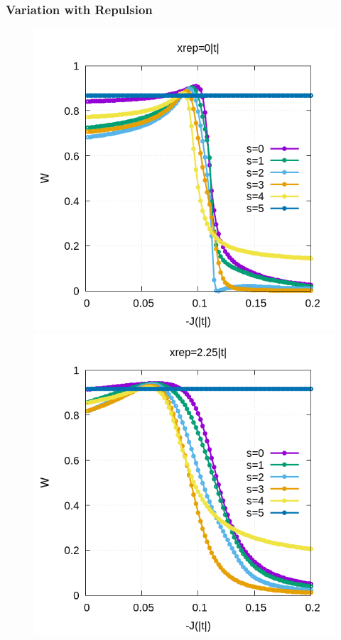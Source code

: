 \documentclass[ openright,titlepage,numbers=noenddot,headinclude,twoside,%
                footinclude=true,cleardoublepage=empty,abstractoff,%
                BCOR=5mm,paper=a4,fontsize=11pt,%
                ngerman,american,%
]{scrreprt}
\begin{document}
\subsubsection{Variation with Repulsion}
\begin{figure}[h!]
\centering
    \hspace{-2cm}
    \begin{minipage}{0.4\textwidth}
    \includegraphics[scale=0.4]{W_vs_J_sites_2-xrep-01.png}
    \end{minipage}
    \hspace{2cm}
    \begin{minipage}{0.4\textwidth}
    \includegraphics[scale=0.4]{W_vs_J_sites_2-xrep-225.png}

\end{minipage}
\end{figure}
\end{document}
